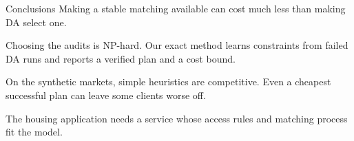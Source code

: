 \begin{frame}[t,label=ending]{Conclusions}
\small
Making a stable matching available can cost much less than making
DA select one.

\medskip
Choosing the audits is NP-hard. Our exact method learns constraints
from failed DA runs and reports a verified plan and a cost bound.

\medskip
On the synthetic markets, simple heuristics are competitive.
Even a cheapest successful plan can leave some clients worse off.

\medskip
The housing application needs a service whose access rules and matching
process fit the model.
\end{frame}
